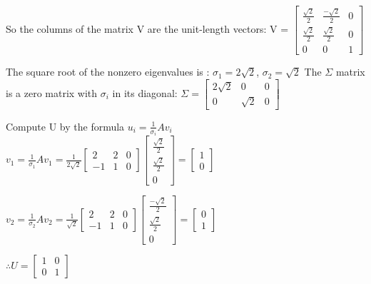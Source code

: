 \documentclass{article} %
\begin{document}
\begin{flushleft}
\begin{enumerate}
            \bigbreak So the columns of the matrix V are the unit-length vectors: V = $\begin{bmatrix}
                \frac{\sqrt{2}}{2} & \frac{-\sqrt{2}}{2} & 0 \\ \frac{\sqrt{2}}{2} & \frac{\sqrt{2}}{2} & 0 \\ 0 & 0 & 1
            \end{bmatrix}$

            \bigbreak
            \text The square root of the nonzero eigenvalues is : $\sigma_{1} = 2\sqrt{2}$, $\sigma_{2} = \sqrt{2}$
            \break The $\Sigma$ matrix is a zero matrix with $\sigma_{i}$ in its diagonal: $\Sigma = \begin{bmatrix}
                2\sqrt{2} & 0 & 0 \\ 0 & \sqrt{2} & 0
            \end{bmatrix}$

            \bigbreak Compute U by the formula $u_{i} = \frac{1}{\sigma_{i}}Av_{i}$
            \bigbreak $v_{1} = \frac{1}{\sigma_{1}}Av_{1} = \frac{1}{2\sqrt{2}}\begin{bmatrix}
                2 & 2 & 0 \\ -1 & 1 & 0
            \end{bmatrix}\begin{bmatrix}
                \frac{\sqrt{2}}{2} \\ \frac{\sqrt{2}}{2} \\ 0
            \end{bmatrix} = \begin{bmatrix}
                1 \\ 0
            \end{bmatrix}$

            \bigbreak $v_{2} = \frac{1}{\sigma_{2}}Av_{2} = \frac{1}{\sqrt{2}}\begin{bmatrix}
                2 & 2 & 0 \\ -1 & 1 & 0
            \end{bmatrix}\begin{bmatrix}
                \frac{-\sqrt{2}}{2} \\ \frac{\sqrt{2}}{2} \\ 0
            \end{bmatrix} = \begin{bmatrix}
                0 \\ 1
            \end{bmatrix}$

            \bigbreak \(\therefore U = \begin{bmatrix}
                1 & 0 \\ 0 & 1
            \end{bmatrix}\)
            

\end{enumerate}
\end{flushleft}
\end{document}
